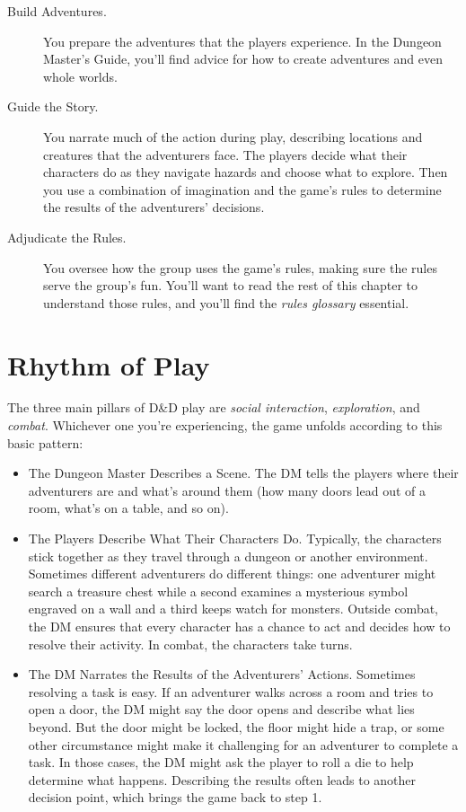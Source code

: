 \documentclass[10pt,a4paper,twoside,bg=print,twocolumn,openany,nodeprecatedcode]{dndbook}
\begin{document}
\begin{description}
\item[Build Adventures.]
You prepare the adventures that the players experience. In the Dungeon Master's Guide, you'll find advice for how to create adventures and even whole worlds.
\item[Guide the Story.]
You narrate much of the action during play, describing locations and creatures that the adventurers face. The players decide what their characters do as they navigate hazards and choose what to explore. Then you use a combination of imagination and the game's rules to determine the results of the adventurers' decisions.
\item[Adjudicate the Rules.]
You oversee how the group uses the game's rules, making sure the rules serve the group's fun. You'll want to read the rest of this chapter to understand those rules, and you'll find the \textit{rules glossary} essential.
\end{description}

\section{Rhythm of Play}
The three main pillars of D\&D play are \textit{social interaction}, \textit{exploration}, and \textit{combat}. Whichever one you're experiencing, the game unfolds according to this basic pattern:


\begin{itemize}
\item{The Dungeon Master Describes a Scene.}
The DM tells the players where their adventurers are and what's around them (how many doors lead out of a room, what's on a table, and so on).
\item{The Players Describe What Their Characters Do.}
Typically, the characters stick together as they travel through a dungeon or another environment. Sometimes different adventurers do different things: one adventurer might search a treasure chest while a second examines a mysterious symbol engraved on a wall and a third keeps watch for monsters. Outside combat, the DM ensures that every character has a chance to act and decides how to resolve their activity. In combat, the characters take turns.
\item{The DM Narrates the Results of the Adventurers' Actions.}
Sometimes resolving a task is easy. If an adventurer walks across a room and tries to open a door, the DM might say the door opens and describe what lies beyond. But the door might be locked, the floor might hide a trap, or some other circumstance might make it challenging for an adventurer to complete a task. In those cases, the DM might ask the player to roll a die to help determine what happens. Describing the results often leads to another decision point, which brings the game back to step 1.
\end{itemize}
\end{document}
